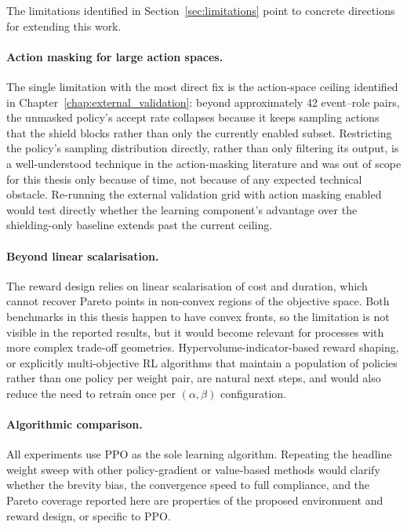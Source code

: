 The limitations identified in Section~\ref{sec:limitations} point to concrete directions for extending this work.

\paragraph{Action masking for large action spaces.} The single limitation with the most direct fix is the action-space ceiling identified in Chapter~\ref{chap:external_validation}: beyond approximately 42 event--role pairs, the unmasked policy's accept rate collapses because it keeps sampling actions that the shield blocks rather than only the currently enabled subset. Restricting the policy's sampling distribution directly, rather than only filtering its output, is a well-understood technique in the action-masking literature and was out of scope for this thesis only because of time, not because of any expected technical obstacle. Re-running the external validation grid with action masking enabled would test directly whether the learning component's advantage over the shielding-only baseline extends past the current ceiling.

\paragraph{Beyond linear scalarisation.} The reward design relies on linear scalarisation of cost and duration, which cannot recover Pareto points in non-convex regions of the objective space. Both benchmarks in this thesis happen to have convex fronts, so the limitation is not visible in the reported results, but it would become relevant for processes with more complex trade-off geometries. Hypervolume-indicator-based reward shaping, or explicitly multi-objective RL algorithms that maintain a population of policies rather than one policy per weight pair, are natural next steps, and would also reduce the need to retrain once per $(\alpha,\beta)$ configuration.

\paragraph{Algorithmic comparison.} All experiments use \ac{PPO} as the sole learning algorithm. Repeating the headline weight sweep with other policy-gradient or value-based methods would clarify whether the brevity bias, the convergence speed to full compliance, and the Pareto coverage reported here are properties of the proposed environment and reward design, or specific to \ac{PPO}.

